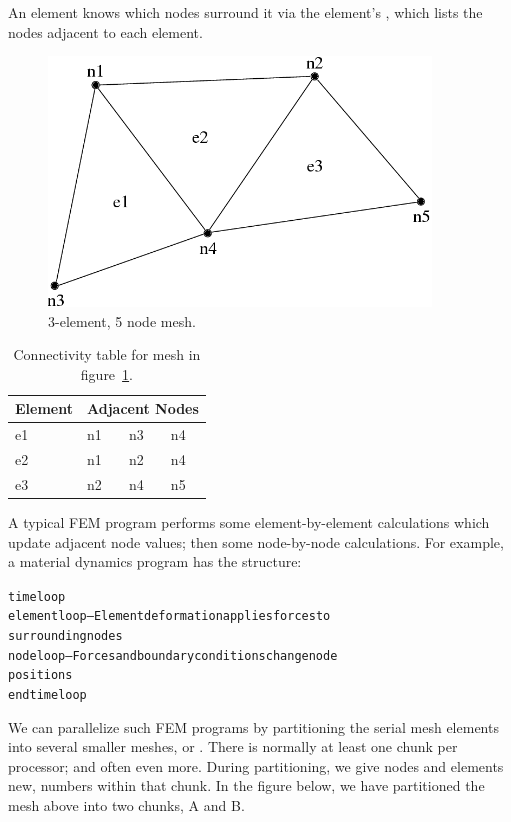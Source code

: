 \documentclass[10pt]{article}
\begin{document}
An element knows which nodes surround it via the element's
, which lists the nodes adjacent to each element.

\begin{figure}[h]
\begin{center}
\includegraphics[width=4in]{fig/simple_mesh}
\end{center}
\caption{3-element, 5 node mesh.}
\label{fig:simplemesh}
\end{figure}

\begin{table}[h]
\begin{center}
\begin{tabular}{||l||l|l|l||}\hline
Element & \multicolumn{3}{c||}{Adjacent Nodes} \\\hline
e1 & n1 & n3 & n4 \\
e2 & n1 & n2 & n4 \\
e3 & n2 & n4 & n5 \\
\hline
\end{tabular}
\end{center}
\caption{Connectivity table for mesh in figure~\ref{fig:simplemesh}.}
\label{table:simplemesh}
\end{table}

A typical FEM program performs some element-by-element calculations which
update adjacent node values; then some node-by-node calculations.  For
example, a material dynamics program has the structure:

\begin{alltt}
     time loop
          element loop-- Element deformation applies forces to
          surrounding nodes
          node loop-- Forces and boundary conditions change node
          positions
     end time loop
\end{alltt}

We can parallelize such FEM programs by partitioning the serial mesh
elements into several smaller meshes, or .  There is normally
at least one chunk per processor; and often even more.  During partitioning, 
we give nodes and elements new,  numbers within that chunk.
In the figure below, we have partitioned the mesh above into two chunks, A and B.
\end{document}
